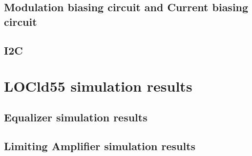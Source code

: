 \documentclass[11pt,a4paper]{article}
\begin{document}
\begin{spacing}{1.25}
\subsection{Modulation biasing circuit and Current biasing circuit}

\subsection{I2C}

\section{LOCld55 simulation results}        %

\subsection{Equalizer simulation results}

\subsection{Limiting Amplifier simulation results}


\end{spacing}



\end{document}
